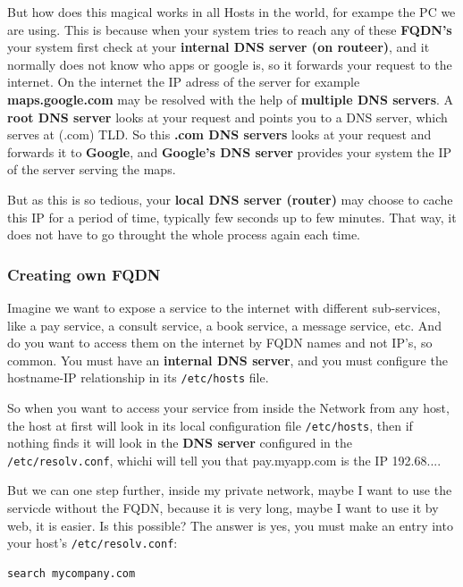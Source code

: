 \documentclass{article}
\newenvironment{codetemplate}[1][]{%
  \mybasecolorbox[#1]
  \itshape
}{%
  \endmybasecolorbox
}
\begin{document}
But how does this magical works in all Hosts in the world, for exampe the PC we are using. This is because when your system tries to reach any of these \textbf{FQDN's} your system first check at your \textbf{internal DNS server (on routeer)}, and it normally does not know who apps or google is, so it forwards your request to the internet. On the internet the IP adress of the server for example \textbf{maps.google.com} may be resolved with the help of \textbf{multiple DNS servers}. A \textbf{root DNS server} looks at your request and points you to a DNS server, which serves at (.com) TLD. So this \textbf{.com DNS servers} looks at your request and forwards it to \textbf{Google}, and \textbf{Google's DNS server} provides your system the IP of the server serving the maps.

But as this is so tedious, your \textbf{local DNS server (router)} may choose to cache this IP for a period of time, typically few seconds up to few minutes. That way, it does not have to go throught the whole process again each time.


\subsubsection{Creating own FQDN}

Imagine we want to expose a service to the internet with different sub-services, like a pay service, a consult service, a book service, a message service, etc. And do you want to access them on the internet by FQDN names and not IP's, so common. You must have an \textbf{internal DNS server}, and you must configure the hostname-IP relationship in its \verb|/etc/hosts| file.

So when you want to access your service from inside the Network from any host, the host at first will look in its local configuration file \verb|/etc/hosts|, then if nothing finds it will look in the \textbf{DNS server} configured in the \verb|/etc/resolv.conf|, whichi will tell you that pay.myapp.com is the IP 192.68....

But we can one step further, inside my private network, maybe I want to use the servicde without the FQDN, because it is very long, maybe I want to use it by web, it is easier. Is this possible? The answer is yes, you must make an entry into your host's \verb|/etc/resolv.conf|:

\begin{codetemplate}{}
\begin{verbatim}
search mycompany.com
\end{verbatim}
\end{codetemplate}
\end{document}
